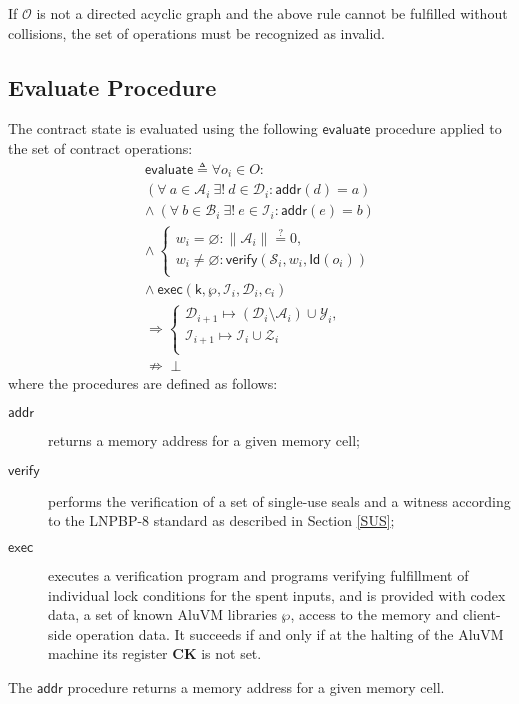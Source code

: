 \documentclass[9pt,oneside]{amsart}
\begin{document}
\begin{multicols}{2}
If $\mathcal{O}$ is not a directed acyclic graph and the above rule cannot be fulfilled without
collisions, the set of operations must be recognized as invalid.


\subsection{Evaluate Procedure}\label{Evaluate}

The contract state is evaluated using the following $\mathsf{evaluate}$
procedure applied to the set of contract operations:
\noindent
\begin{equation}\label{eq:evaluate}
\begin{split}
\mathsf{evaluate} \triangleq \forall o_i \in O: \\
(\forall \ a \in \mathcal{A}_i \ \exists! \ d \in \mathcal{D}_i: \mathsf{addr}(d) = a) \\
\wedge \ (\forall \ b \in \mathcal{B}_i \ \exists! \ e \in \mathcal{I}_i: \mathsf{addr}(e) = b) \\
\wedge \ 
\begin{cases}
    w_i = \varnothing : \|\mathcal{A}_i\| \stackrel{?}{=} 0, \\
    w_i \neq \varnothing : \mathsf{verify}(\mathcal{S}_i, w_i, \mathsf{Id}(o_i)) \\
\end{cases} \\
\wedge \ \mathsf{exec}(\mathsf{k}, \wp, \mathcal{I}_i, \mathcal{D}_i, c_i) \\
\Rightarrow 
\begin{cases}
    \mathcal{D}_{i+1} \mapsto (\mathcal{D}_i \setminus \mathcal{A}_i) \cup \mathcal{Y}_i, \\[6pt]
    \mathcal{I}_{i+1} \mapsto \mathcal{I}_i \cup \mathcal{Z}_i \\
\end{cases} \\
\nRightarrow \perp
\end{split}
\end{equation}
\noindent
where the procedures are defined as follows:
\begin{description}
    \item[$\mathsf{addr}$] returns a memory address for a given memory cell;
    \item[$\mathsf{verify}$] performs the verification of a set of single-use seals and a witness
        according to the LNPBP-8 standard \cite{LNPBP8} as described in Section \ref{SUS};
    \item[$\mathsf{exec}$] executes a verification program
        and programs verifying fulfillment of individual lock conditions for the spent inputs,
        and is provided with codex data, a set of known AluVM libraries $\wp$,
        access to the memory and client-side operation data.
        It succeeds if and only if at the halting of the AluVM machine
        its register \textbf{CK} is not set.
\end{description}
The $\mathsf{addr}$ procedure returns a memory address for a given memory cell.


\end{multicols}
\end{document}
